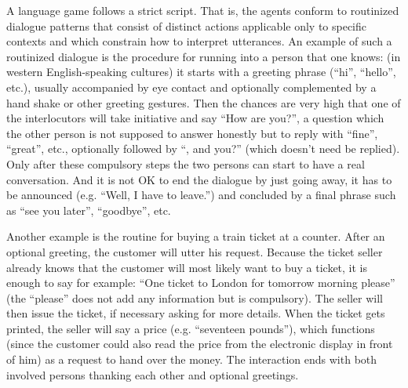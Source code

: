 A language game follows a strict script. That is, the agents conform
to routinized dialogue patterns that consist of distinct actions
applicable only to specific contexts and which constrain how to
interpret utterances. An example of such a routinized dialogue is the
procedure for running into a person that one knows: (in western
English-speaking cultures) it starts with a greeting phrase (``hi'',
``hello'', etc.), usually accompanied by eye contact and optionally
complemented by a hand shake or other greeting gestures. Then the
chances are very high that one of the interlocutors will take
initiative and say ``How are you?'', a question which the other person
is not supposed to answer honestly but to reply with ``fine'',
``great'', etc., optionally followed by ``, and you?''  (which doesn't
need be replied). Only after these compulsory steps the two persons
can start to have a real conversation. And it is not OK to end the
dialogue by just going away, it has to be announced (e.g. ``Well, I
have to leave.'') and concluded by a final phrase such as ``see you
later'', ``goodbye'', etc.

Another example is the routine for buying a train ticket at a counter.
After an optional greeting, the customer will utter his
request. Because the ticket seller already knows that the customer
will most likely want to buy a ticket, it is enough to say for
example: ``One ticket to London for tomorrow morning please'' (the
``please'' does not add any information but is compulsory). The seller
will then issue the ticket, if necessary asking for more details. When
the ticket gets printed, the seller will say a price (e.g. ``seventeen
pounds''), which functions (since the customer could also read the
price from the electronic display in front of him) as a request to
hand over the money. The interaction ends with both involved persons
thanking each other and optional greetings.

